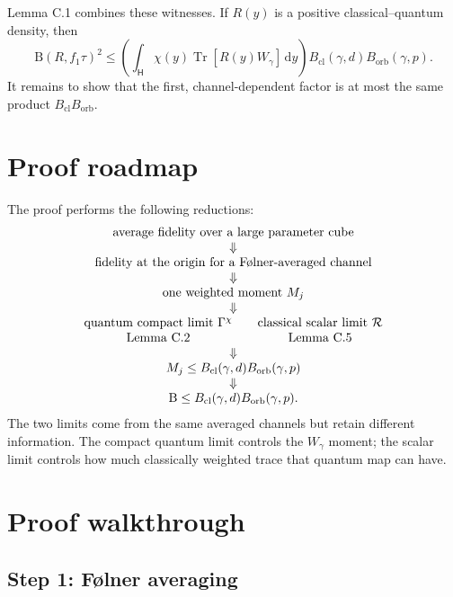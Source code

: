 \documentclass[11pt]{article}
\newcommand{\Hc}{\mathsf H}
\newcommand{\Tr}{\operatorname{Tr}}
\newcommand{\dd}{\,\mathrm d}
\newcommand{\B}{\mathrm B}
\newcommand{\Bcl}{B_{\mathrm{cl}}}
\newcommand{\Borb}{B_{\mathrm{orb}}}
\begin{document}
Lemma C.1 combines these witnesses.  If $R(y)$ is a positive
classical--quantum density, then
\begin{equation}\label{eq:weighted-hybrid}
  \B(R,f_1\tau)^2
  \leq
  \left(\int_{\Hc}\chi(y)\Tr[R(y)W_\gamma]\dd y\right)
  \Bcl(\gamma,d)\Borb(\gamma,p).
\end{equation}
It remains to show that the first, channel-dependent factor is at most the
same product $\Bcl\Borb$.

\section{Proof roadmap}

The proof performs the following reductions:
\[
\begin{array}{c}
\text{average fidelity over a large parameter cube}\\
\Downarrow\\
\text{fidelity at the origin for a F\o lner-averaged channel}\\
\Downarrow\\
\text{one weighted moment }M_j\\
\Downarrow\\
\begin{array}{c@{\qquad}c}
\text{quantum compact limit }\Gamma^\chi
&\text{classical scalar limit }\mathcal R\\
\text{Lemma C.2}&\text{Lemma C.5}
\end{array}\\
\Downarrow\\
M_j\leq\Bcl(\gamma,d)\Borb(\gamma,p)\\
\Downarrow\\
\B\leq\Bcl(\gamma,d)\Borb(\gamma,p).
\end{array}
\]
The two limits come from the same averaged channels but retain different
information.  The compact quantum limit controls the $W_\gamma$ moment; the
scalar limit controls how much classically weighted trace that quantum map
can have.

\section{Proof walkthrough}

\subsection*{Step 1: F\o lner averaging}
\end{document}
